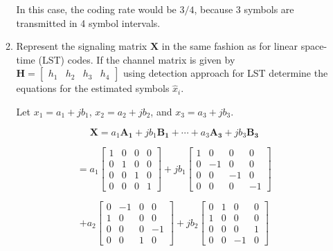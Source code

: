 \documentclass[fleqn]{article}
\begin{document}
\begin{enumerate}
\begin{enumerate}
			In this case, the coding rate would be $3/4$, because 3 symbols are transmitted in 4 symbol intervals.
			
			\item Represent the signaling matrix $\mathbf{X}$ in the same fashion as for linear space-time (LST) codes. If the channel matrix is given by $\mathbf{H}=\begin{bmatrix} h_1 & h_2 & h_3 & h_4 \end{bmatrix}$ using detection approach for LST determine the equations for the estimated symbols $\hat{x}_i$.
			
			Let $x_1 = a_1 + jb_1$, $x_2 = a_2 + jb_2$, and $x_3 = a_3 + jb_3$.
			
			\begin{equation*}
				\mathbf{X} = a_1\mathbf{A_1} + jb_1\mathbf{B_1} + \cdots + a_3\mathbf{A_3} + jb_3\mathbf{B_3}
			\end{equation*}
			
			\begin{equation*}
				= a_1\begin{bmatrix}
					1 & 0 & 0 & 0 \\
					0 & 1 & 0 & 0 \\
					0 & 0 & 1 & 0 \\
					0 & 0 & 0 & 1
				\end{bmatrix} + jb_1\begin{bmatrix}
					1 &  0 &  0 &  0 \\
					0 & -1 &  0 &  0 \\
					0 &  0 & -1 &  0 \\
					0 &  0 &  0 & -1
				\end{bmatrix}
			\end{equation*}
			
			\begin{equation*}
				 + a_2\begin{bmatrix}
					0 & -1 & 0 &  0 \\
					1 &  0 & 0 &  0 \\
					0 &  0 & 0 & -1 \\
					0 &  0 & 1 &  0
				\end{bmatrix} + jb_2\begin{bmatrix}
					0 & 1 &  0 & 0 \\
					1 & 0 &  0 & 0 \\
					0 & 0 &  0 & 1 \\
					0 & 0 & -1 & 0
				\end{bmatrix}
			\end{equation*}
			

\end{enumerate}
\end{enumerate}
\end{document}
